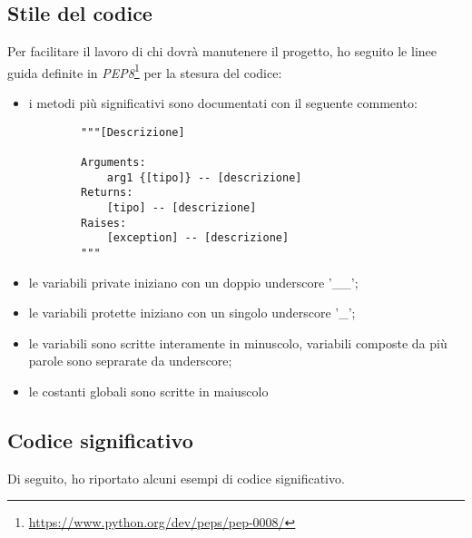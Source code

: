 \subsection{Stile del codice}
Per facilitare il lavoro di chi dovrà manutenere il progetto, ho seguito le linee guida definite in \textit{PEP8}\footnote{\url{https://www.python.org/dev/peps/pep-0008/}} per la stesura del codice:
\begin{itemize}
    \item i metodi più significativi sono documentati con il seguente commento:
    \begin{lstlisting}
        """[Descrizione]

        Arguments:
            arg1 {[tipo]} -- [descrizione]
        Returns:
            [tipo] -- [descrizione]
        Raises:
            [exception] -- [descrizione]
        """
    \end{lstlisting}
    \item le variabili private iniziano con un doppio underscore '\_\_';
    \item le variabili protette iniziano con un singolo underscore '\_';
    \item le variabili sono scritte interamente in minuscolo, variabili composte da più parole sono seprarate da underscore;
    \item le costanti globali sono scritte in maiuscolo
\end{itemize}

\subsection{Codice significativo}

Di seguito, ho riportato alcuni esempi di codice significativo.
